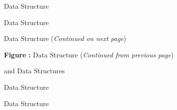\clearpage
\begin{figure}[!htp]
\centering

\caption{ Data Structure}
\label{f:FamilyBC}
\end{figure}

\clearpage
\begin{figure}[!htp]
\centering

\caption{ Data Structure}
\label{f:FamilyBCDataSet}
\end{figure}


\clearpage
\begin{figure}[!htp]
\centering
\resizebox{\linewidth}{!}{}
\caption[ Data Structure]{ Data Structure (\textit{Continued on next page})}
\label{f:FlowEquationSet}
\end{figure}
\clearpage
\begin{figure}[!htp]
\centering
\resizebox{\linewidth}{!}{}
\par\vspace{\abovecaptionskip}
\textbf{Figure :}  Data Structure (\textit{Continued from previous page})
\end{figure}

\clearpage
\begin{figure}[!htp]
\centering
\resizebox{\linewidth}{!}{}
%
\caption{ and  Data Structures}
\label{f:FlowSolution}
\end{figure}

\clearpage
\begin{figure}[!htp]
\centering

\caption{ Data Structure}
\label{f:GasModel}
\end{figure}

\clearpage
\begin{figure}[!htp]
\centering

\caption{ Data Structure}
\label{f:GeometryReference}
\end{figure}

